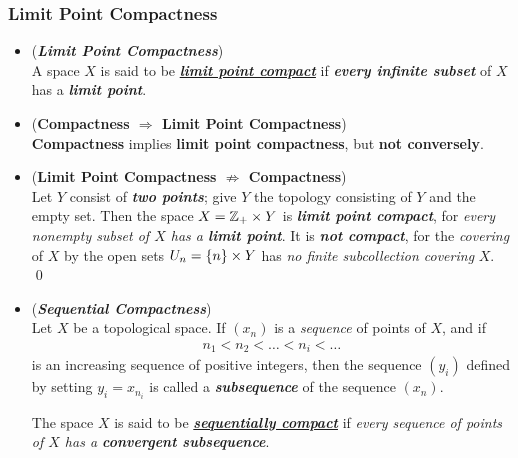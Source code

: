 \documentclass[11pt]{article}
\begin{document}
\subsubsection{Limit Point Compactness}
\begin{itemize}
\item \begin{definition} (\emph{\textbf{Limit Point Compactness}})\\
A space $X$ is said to be \underline{\emph{\textbf{limit point compact}}} if \emph\textbf{{every infinite subset}} of $X$ has a \emph{\textbf{limit point}}.
\end{definition}

\item \begin{proposition}(\textbf{Compactness $\Rightarrow$ Limit Point Compactness}) \citep{munkres2000topology}\\
\textbf{Compactness} implies \textbf{limit point compactness}, but \textbf{not conversely}.
\end{proposition}

\item \begin{example}(\textbf{Limit Point Compactness $\not\Rightarrow$ Compactness}) \\
Let $Y$ consist of \emph{\textbf{two points}}; give $Y$ the topology consisting of $Y$ and the empty set. Then the space $X = {\mathbb Z}_{+} \times Y$ is \textbf{\emph{limit point compact}}, for \emph{every nonempty subset of $X$ has a \textbf{limit point}}. It is \emph{\textbf{not compact}}, for the \emph{covering} of $X$ by the open sets $U_n = \left\{n\right\} \times Y$ has \emph{no finite subcollection covering} $X$. \qed
\end{example}

\item \begin{definition} (\emph{\textbf{Sequential Compactness}})\\
Let $X$ be a topological space. If $(x_n)$ is a \emph{sequence} of points of $X$, and if
\begin{align*}
n_1 < n_2 < \ldots < n_i < \ldots
\end{align*}
is an increasing sequence of positive integers, then the sequence $(y_i)$ defined by setting $y_i = x_{n_i}$ is called a \emph{\textbf{subsequence}} of the sequence $(x_n)$. 

The space $X$ is said to be \underline{\emph{\textbf{sequentially compact}}} if \emph{every sequence of points of $X$ has a \textbf{convergent subsequence}}.
\end{definition}


\end{itemize}
\end{document}
